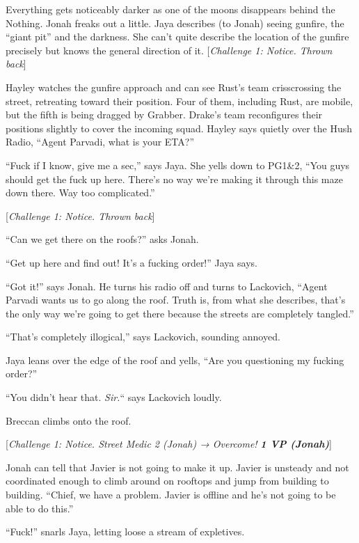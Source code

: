 Everything gets noticeably darker as one of the moons disappears behind the Nothing.  Jonah freaks out a little.  Jaya describes (to Jonah) seeing gunfire, the ``giant pit'' and the darkness.  She can't quite describe the location of the gunfire precisely but knows the general direction of it.  {[}\textit{Challenge 1: Notice.  Thrown back}{]}



Hayley watches the gunfire approach and can see Rust's team crisscrossing the street, retreating toward their position.  Four of them, including Rust, are mobile, but the fifth is being dragged by Grabber.  Drake's team reconfigures their positions slightly to cover the incoming squad.  Hayley says quietly over the Hush Radio, ``Agent Parvadi, what is your ETA?''

``Fuck if I know, give me a sec,'' says Jaya.  She yells down to PG1\&2, ``You guys should get the fuck up here.  There's no way we're making it through this maze down there.  Way too complicated.''

{[}\textit{Challenge 1: Notice.  Thrown back}{]}  

``Can we get there on the roofs?'' asks Jonah.

``Get up here and find out!  It's a fucking order!'' Jaya says.

``Got it!'' says Jonah.  He turns his radio off and turns to Lackovich, ``Agent Parvadi wants us to go along the roof.  Truth is, from what she describes, that's the only way we're going to get there because the streets are completely tangled.''

``That's completely illogical,'' says Lackovich, sounding annoyed.

Jaya leans over the edge of the roof and yells, ``Are you questioning my fucking order?''

``You didn't hear that.  \textit{Sir.}`` says Lackovich loudly.

Breccan climbs onto the roof.

{[}\textit{Challenge 1: Notice.  Street Medic 2 (Jonah) → Overcome! }\textit{\textbf{1 VP (Jonah)}}{]}

Jonah can tell that Javier is not going to make it up.  Javier is unsteady and not coordinated enough to climb around on rooftops and jump from building to building.  ``Chief, we have a problem.  Javier is offline and he's not going to be able to do this.''

``Fuck!'' snarls Jaya, letting loose a stream of expletives.

